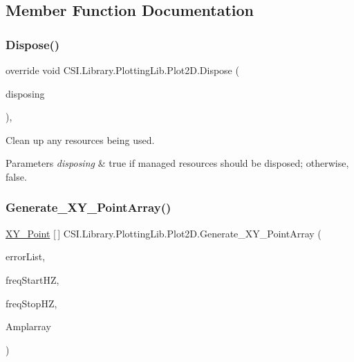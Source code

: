 \subsection{Member Function Documentation}
\mbox{\label{class_c_s_i_1_1_library_1_1_plotting_lib_1_1_plot2_d_afe5dde960d2dbef84ca47248f330efd8}} 
\subsubsection{\texorpdfstring{Dispose()}{Dispose()}}
{\footnotesize\ttfamily override void C\+S\+I.\+Library.\+Plotting\+Lib.\+Plot2\+D.\+Dispose (\begin{DoxyParamCaption}\item[{bool}]{disposing }\end{DoxyParamCaption})\hspace{0.3cm}{\ttfamily [inline]}, {\ttfamily [protected]}}



Clean up any resources being used. 


\begin{DoxyParams}{Parameters}
{\em disposing} & true if managed resources should be disposed; otherwise, false.\\
\hline
\end{DoxyParams}
\mbox{\label{class_c_s_i_1_1_library_1_1_plotting_lib_1_1_plot2_d_a7736899c69b8c63ff36585742c76a84a}} 
\subsubsection{\texorpdfstring{Generate\_XY\_PointArray()}{Generate\_XY\_PointArray()}}
{\footnotesize\ttfamily \mbox{\hyperlink{struct_c_s_i_1_1_library_1_1_data_types_1_1_x_y___point}{X\+Y\+\_\+\+Point}} \mbox{[}$\,$\mbox{]} C\+S\+I.\+Library.\+Plotting\+Lib.\+Plot2\+D.\+Generate\+\_\+\+X\+Y\+\_\+\+Point\+Array (\begin{DoxyParamCaption}\item[{\mbox{\hyperlink{class_c_s_i_1_1_library_1_1_errors_1_1_error_list}{Error\+List}}}]{error\+List,  }\item[{double}]{freq\+Start\+HZ,  }\item[{double}]{freq\+Stop\+HZ,  }\item[{double \mbox{[}$\,$\mbox{]}}]{Amplarray }\end{DoxyParamCaption})\hspace{0.3cm}{\ttfamily [inline]}}



